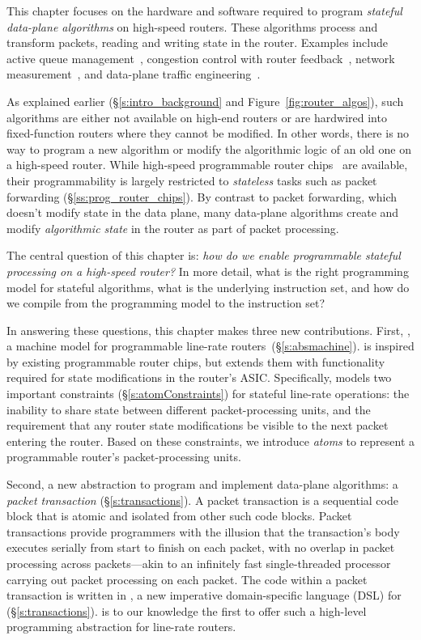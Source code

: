 This chapter focuses on the hardware and software required to program {\em
stateful data-plane algorithms} on high-speed routers. These algorithms process
and transform packets, reading and writing state in the router. Examples
include active queue management~\cite{red,avq,codel}, congestion control with
router feedback~\cite{xcp, rcp}, network measurement~\cite{opensketch,
bitmap_george}, and data-plane traffic engineering~\cite{conga, flowlets}.

As explained earlier (\S\ref{s:intro_background} and
Figure~\ref{fig:router_algos}), such algorithms are either not available on
high-end routers or are hardwired into fixed-function routers where they cannot
be modified. In other words, there is no way to program a new algorithm or
modify the algorithmic logic of an old one on a high-speed router. While
high-speed programmable router chips~\cite{flexpipe, xpliant} are available,
their programmability is largely restricted to {\em stateless} tasks such as
packet forwarding (\S\ref{ss:prog_router_chips}). By contrast to packet
forwarding, which doesn't modify state in the data plane, many data-plane
algorithms create and modify {\em algorithmic state} in the router as part of
packet processing.

The central question of this chapter is: {\em how do we enable programmable
stateful processing on a high-speed router?} In more detail, what is the right
programming model for stateful algorithms, what is the underlying instruction
set, and how do we compile from the programming model to the instruction set?

In answering these questions, this chapter makes three new contributions.
First, {\em \absmachine}, a machine model for programmable line-rate
routers~(\S\ref{s:absmachine}).  \absmachine is inspired by existing
programmable router chips, but extends them with functionality required for
state modifications in the router's ASIC.  Specifically, \absmachine models two
important constraints (\S\ref{s:atomConstraints}) for stateful line-rate
operations: the inability to share state between different packet-processing
units, and the requirement that any router state modifications be visible to
the next packet entering the router. Based on these constraints, we introduce
{\em atoms} to represent a programmable router's packet-processing units.

Second, a new abstraction to program and implement data-plane algorithms: a
{\em packet transaction} (\S\ref{s:transactions}). A packet transaction is a
sequential code block that is atomic and isolated from other such code blocks.
Packet transactions provide programmers with the illusion that the
transaction's body executes serially from start to finish on each packet, with
no overlap in packet processing across packets---akin to an infinitely fast
single-threaded processor carrying out packet processing on each packet. The
code within a packet transaction is written in {\em \pktlanguage{}}, a new
imperative domain-specific language (DSL) for (\S\ref{s:transactions}).
\pktlanguage is  to our knowledge the first to offer such a high-level
programming abstraction for line-rate routers.

